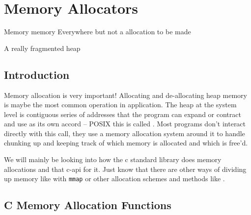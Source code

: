 \chapter{Memory Allocators}

\epigraph{Memory memory Everywhere but not a allocation to be made}{A really fragmented heap}

\section{Introduction}

Memory allocation is very important! Allocating and de-allocating heap memory is maybe the most common operation in application. The heap at the system level is contiguous series of addresses that the program can expand or contract and use as its own accord -- POSIX this is called . Most programs don't interact directly with this call, they use a memory allocation system around it to handle chunking up and keeping track of which memory is allocated and which is free'd.

We will mainly be looking into how the c standard library does memory allocations and that c-api for it. Just know that there are other ways of dividing up memory like with \texttt{mmap} or other allocation schemes and methods like .

\section{C Memory Allocation Functions}

